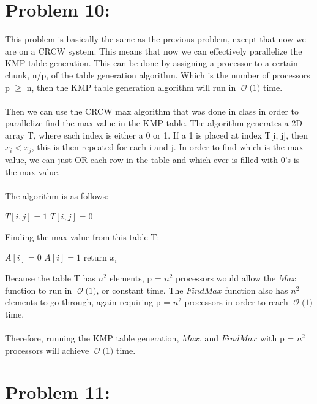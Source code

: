 \documentclass[12pt]{article}
\newcommand{\BigO}[1]{\ensuremath{\operatorname{\mathcal{O}}\bigl(#1\bigr)}}
\begin{document}
\section*{Problem 10: }
This problem is basically the same as the previous problem, except that now we are on a CRCW system. This means that now we can effectively parallelize the KMP table generation. This can be done by assigning a processor to a certain chunk, n/p, of the table generation algorithm. Which is the number of processors p {$\geq$} n, then the KMP table generation algorithm will run in \BigO 1 time.\\\\
Then we can use the CRCW max algorithm that was done in class in order to parallelize find the max value in the KMP table. The algorithm generates a 2D array T, where each index is either a 0 or 1. If a 1 is placed at index T[i, j], then {$x_i < x_j$}, this is then repeated for each i and j. In order to find which is the max value, we can just OR each row in the table and which ever is filled with 0's is the max value.\\\\
The algorithm is as follows:\\
\begin{algorithm}[H]
	{$T[i,j] = 1$}
\Else
	{$T[i,j] = 0$}
\end{algorithm}
Finding the max value from this table T:\\
\begin{algorithm}[H]
{$A[i] = 0$}
	{$A[i] = 1$}
	{return $x_i$}
\end{algorithm}
Because the table T has {$n^2$} elements, p = {$n^2$} processors would allow the {$Max$} function to run in \BigO 1, or constant time. The {$FindMax$} function also has {$n^2$} elements to go through, again requiring p = {$n^2$} processors in order to reach \BigO 1 time.\\\\
Therefore, running the KMP table generation, {$Max$}, and {$FindMax$} with p = {$n^2$} processors will achieve \BigO 1 time.
\section*{Problem 11: }
\end{document}
